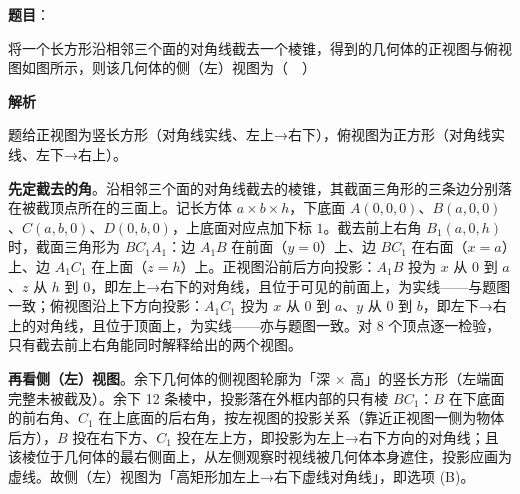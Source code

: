 \begin{answer}

\textbf{题目}：

将一个长方形沿相邻三个面的对角线截去一个棱锥，得到的几何体的正视图与俯视图如图所示，则该几何体的侧（左）视图为（　）
\nopagebreak[4]
\begin{center}\end{center}
\nopagebreak[4]
\textbf{解析}

题给正视图为竖长方形（对角线实线、左上→右下），俯视图为正方形（对角线实线、左下→右上）。

\textbf{先定截去的角}。沿相邻三个面的对角线截去的棱锥，其截面三角形的三条边分别落在被截顶点所在的三面上。记长方体 \(a\times b\times h\)，下底面 \(A(0,0,0)\)、\(B(a,0,0)\)、\(C(a,b,0)\)、\(D(0,b,0)\)，上底面对应点加下标 \(1\)。截去前上右角 \(B_{1}(a,0,h)\) 时，截面三角形为 \(BC_{1}A_{1}\)：边 \(A_{1}B\) 在前面（\(y=0\)）上、边 \(BC_{1}\) 在右面（\(x=a\)）上、边 \(A_{1}C_{1}\) 在上面（\(z=h\)）上。正视图沿前后方向投影：\(A_{1}B\) 投为 \(x\) 从 \(0\) 到 \(a\)、\(z\) 从 \(h\) 到 \(0\)，即左上→右下的对角线，且位于可见的前面上，为实线——与题图一致；俯视图沿上下方向投影：\(A_{1}C_{1}\) 投为 \(x\) 从 \(0\) 到 \(a\)、\(y\) 从 \(0\) 到 \(b\)，即左下→右上的对角线，且位于顶面上，为实线——亦与题图一致。对 8 个顶点逐一检验，只有截去前上右角能同时解释给出的两个视图。

\textbf{再看侧（左）视图}。余下几何体的侧视图轮廓为「深 \(\times\) 高」的竖长方形（左端面完整未被截及）。余下 12 条棱中，投影落在外框内部的只有棱 \(BC_{1}\)：\(B\) 在下底面的前右角、\(C_{1}\) 在上底面的后右角，按左视图的投影关系（靠近正视图一侧为物体后方），\(B\) 投在右下方、\(C_{1}\) 投在左上方，即投影为左上→右下方向的对角线；且该棱位于几何体的最右侧面上，从左侧观察时视线被几何体本身遮住，投影应画为虚线。故侧（左）视图为「高矩形加左上→右下虚线对角线」，即选项 (B)。


\end{answer}
